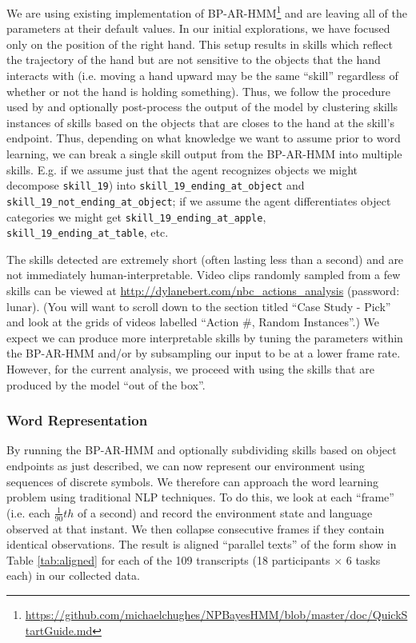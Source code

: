 \documentclass[11pt]{article}
\begin{document}
We are using existing implementation of BP-AR-HMM\footnote{\url{https://github.com/michaelchughes/NPBayesHMM/blob/master/doc/QuickStartGuide.md}} and are leaving all of the parameters at their default values. In our initial explorations, we have focused only on the position of the right hand. This setup results in skills which reflect the trajectory of the hand but are not sensitive to the objects that the hand interacts with (i.e. moving a hand upward may be the same ``skill'' regardless of whether or not the hand is holding something). Thus, we follow the procedure used by \cite{george} and optionally post-process the output of the model by clustering skills instances of skills based on the objects that are closes to the hand at the skill's endpoint. Thus, depending on what knowledge we want to assume prior to word learning, we can break a single skill output from the BP-AR-HMM into multiple skills. E.g. if we assume just that the agent recognizes objects we might decompose \texttt{skill\_19}) into \texttt{skill\_19\_ending\_at\_object} and \texttt{skill\_19\_not\_ending\_at\_object};  if we assume the agent differentiates object categories we might get \texttt{skill\_19\_ending\_at\_apple},  \texttt{skill\_19\_ending\_at\_table}, etc. 

The skills detected are extremely short (often lasting less than a second) and are not immediately human-interpretable. Video clips randomly sampled from a few skills can be viewed at  \url{http://dylanebert.com/nbc_actions_analysis} (password: lunar). (You will want to scroll down to the section titled ``Case Study  -  Pick'' and look at the grids of videos labelled ``Action \#, Random Instances''.) We expect we can produce more interpretable skills by tuning the parameters within the BP-AR-HMM and/or by subsampling our input to be at a lower frame rate. However, for the current analysis, we proceed with using the skills that are produced by the model ``out of the box''. 

\subsubsection{Word Representation}

By running the BP-AR-HMM and optionally subdividing skills based on object endpoints as just described, we can now represent our environment using sequences of discrete symbols. We therefore can approach the word learning problem using traditional NLP techniques. To do this, we look at each ``frame'' (i.e. each $\frac{1}{90}th$ of a second) and record the environment state and language observed at that instant. We then collapse consecutive frames if they contain identical observations. The result is aligned ``parallel texts'' of the form show in Table \ref{tab:aligned} for each of the 109 transcripts (18 participants $\times$ 6 tasks each) in our collected data. 
\end{document}
